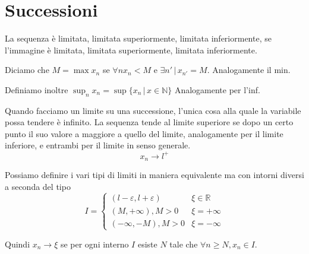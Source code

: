 \documentclass[a4paper]{article}
\begin{document}
\pagebreak

\section{Successioni}

La sequenza è limitata, limitata superiormente, limitata inferiormente,
se l'immagine è limitata, limitata superiormente, limitata inferiormente.

Diciamo che \(M=\max x_n\) se \(\forall n x_n < M\) e \(\exists n' \,|\, x_{n'} = M\).
Analogamente il min.

Definiamo inoltre \(\sup_{n} x_n = \sup \{ x_n \,|\, x \in \mathbb{N} \}\)
Analogamente per l'inf.


Quando facciamo un limite su una successione, l'unica cosa alla quale la variabile possa
tendere è infinito.
La sequenza tende al limite superiore se dopo un certo punto il suo valore a maggiore a quello del limite,
analogamente per il limite inferiore, e entrambi per il limite in senso generale.
\[
    x_n \to l^+
\]

Possiamo definire i vari tipi di limiti in maniera equivalente ma
con intorni diversi a seconda del tipo
\[
    I = \begin{cases}
        (l-\varepsilon, l+\varepsilon) & \xi \in \mathbb{R} \\
        (M, +\infty), M > 0 & \xi = +\infty \\
        (-\infty, -M), M > 0 & \xi = -\infty
    \end{cases}
\]

Quindi \(x_n \to \xi\) se per ogni interno \(I\) esiste \(N\) tale che \(\forall n \geq N, x_n \in I\).




\end{document}
